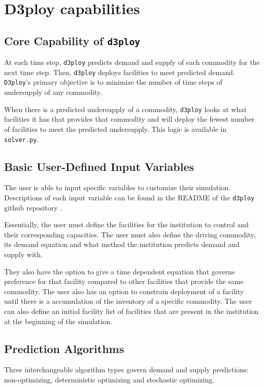 \documentclass{anstrans}
\newcommand{\deploy}{\texttt{d3ploy}\xspace}%
\newcommand{\Deploy}{\texttt{D3ploy}\xspace}%
\begin{document}
\section{D3ploy capabilities}
\subsection{\textbf{Core Capability of \deploy}}
At each time step, \deploy predicts demand and supply of each 
commodity for the next time step.
Then, \deploy deploys facilities to meet predicted demand. 
\Deploy's primary objective is to minimize the number of time 
steps of undersupply of any commodity. 

When there is a predicted undersupply of a commodity, \deploy looks 
at what facilities it has that provides that commodity and 
will deploy the fewest number of facilities
to meet the predicted undersupply. 
This logic is available in \texttt{solver.py}. 

\subsection{\textbf{Basic User-Defined Input Variables}}
The user is able to input specific variables to customize their
simulation. 
Descriptions of each input variable can be found in the 
README of the \deploy github repository \cite{d3ploy_doi_2019}.

Essentially, the user must define the facilities for the 
institution to control and their corresponding capacities. 
The user must also define the driving commodity, its demand 
equation and what method the institution predicts 
demand and supply with. 

They also have the option to give a time dependent equation that governs
preference for that facility compared to other facilities that 
provide the same commodity. 
The user also has an option to constrain deployment of a facility 
until there is a accumulation of the inventory of a specific commodity.  
The user can also define an initial facility list of facilities that 
are present in the institution at the beginning of the simulation. 

\subsection{\textbf{Prediction Algorithms}}
Three interchangeable algorithm types govern demand and supply 
predictions: non-optimizing, deterministic optimizing and stochastic
optimizing. 
\end{document}
